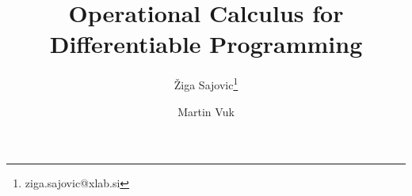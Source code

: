 
\title{Operational Calculus for Differentiable Programming}

\author{\v{Z}iga Sajovic\footnote{ziga.sajovic@xlab.si} \and Martin Vuk}



\maketitle










\printbibliography

  

